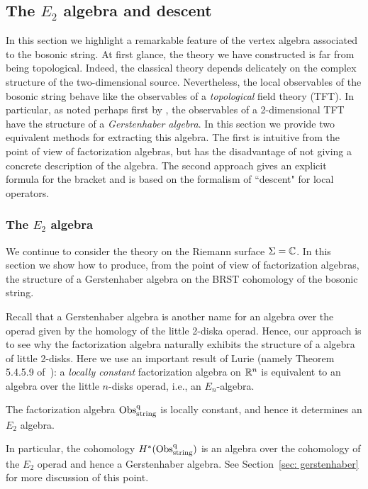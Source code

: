 \subsection{The $E_2$ algebra and descent}

In this section we highlight a remarkable feature of the vertex algebra associated to the bosonic string. 
At first glance, the theory we have constructed is far from being topological.
Indeed, the classical theory depends delicately on the complex structure of the two-dimensional source. 
Nevertheless, the local observables of the bosonic string behave like the observables of a {\em topological} field theory (TFT). 
In particular, as noted perhaps first by \cite{Getzler}, the observables of a 2-dimensional TFT have the structure of a {\em Gerstenhaber algebra}.
In this section we provide two equivalent methods for extracting this algebra.
The first is intuitive from the point of view of factorization algebras, but has the disadvantage of not giving a concrete description of the algebra. 
The second approach gives an explicit formula for the bracket and is based on the formalism of ``descent" for local operators. 

\subsubsection{The $E_2$ algebra}

We continue to consider the theory on the Riemann surface $\Sigma = \mathbb C$. 
In this section we show how to produce, from the point of view of factorization algebras, the structure of a Gerstenhaber algebra on the BRST cohomology of the bosonic string. 

Recall that a Gerstenhaber algebra is another name for an algebra over the operad given by the homology of the little 2-diska operad.
Hence, our approach is to see why the factorization algebra naturally exhibits the structure of a algebra of little 2-disks.
Here we use an important result of Lurie (namely Theorem 5.4.5.9 of~\cite{Lurie}): 
a {\em locally constant} factorization algebra on $\mathbb R^n$ is equivalent to an algebra over the little $n$-disks operad, i.e., an $E_n$-algebra. 

\begin{prop} 
\label{prop: obs is e2}
The factorization algebra ${\rm Obs}^{\rm q}_{\rm string}$ is locally constant, 
and hence it determines an $E_2$ algebra.
\end{prop}

In particular, the cohomology $H^*({\rm Obs}^{\rm q}_{\rm string})$ is an algebra over the cohomology of the $E_2$ operad and hence a Gerstenhaber algebra.
See Section~\ref{sec: gerstenhaber} for more discussion of this point.

